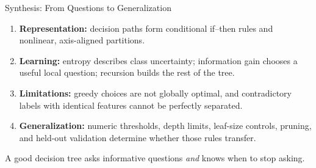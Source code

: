 \documentclass[aspectratio=169,10pt]{beamer}
\begin{document}
\begin{frame}{Synthesis: From Questions to Generalization}
\small
\begin{enumerate}
 \item \textbf{Representation:} decision paths form conditional if--then rules and nonlinear, axis-aligned partitions.
 \item \textbf{Learning:} entropy describes class uncertainty; information gain chooses a useful local question; recursion builds the rest of the tree.
 \item \textbf{Limitations:} greedy choices are not globally optimal, and contradictory labels with identical features cannot be perfectly separated.
 \item \textbf{Generalization:} numeric thresholds, depth limits, leaf-size controls, pruning, and held-out validation determine whether those rules transfer.
\end{enumerate}
\begin{keyidea}A good decision tree asks informative questions \emph{and} knows when to stop asking.\end{keyidea}
\end{frame}
\end{document}
